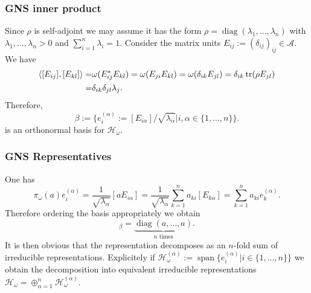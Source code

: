 \documentclass{beamer}
\DeclareMathOperator{\diag}{diag}
\DeclareMathOperator{\Span}{span}
\begin{document}
\begin{frame}
	
	\frametitle{GNS inner product}
	
	\begin{Example}
		Since $\rho$ is self-adjoint we may assume it has the form $\rho=\diag(\lambda_1,\dots,\lambda_n)$ with $\lambda_1,\dots,\lambda_n>0$ and $\sum_{i=1}^n\lambda_i=1$. Consider the matrix units $E_{ij}:=(\delta_{ij})_{ij}\in\mathcal{A}$.  We have
		\begin{align}
		\begin{split}
			\langle[E_{ij}],[E_{kl}]\rangle=&\omega(E_{ij}^*E_{kl})=\omega(E_{ji}E_{kl})=\omega(\delta_{ik}E_{jl})=\delta_{ik}\tr(\rho E_{jl})\\
		=&\delta_{ik}\delta_{jl}\lambda_j.
		\end{split}
		\end{align}
Therefore, 
		\begin{equation}
			\beta:=\{e_i^{(\alpha)}:=[E_{i\alpha}]/\sqrt{\lambda_\alpha}|i,\alpha\in\{1,\dots,n\}\}.
		\end{equation}
is an orthonormal basis for $\mathcal{H}_\omega$.
	\end{Example}
	
\end{frame}

\begin{frame}

	\frametitle{GNS Representatives}
	
	\begin{Example}
		One has
		\begin{equation}
			\pi_\omega(a)e_i^{(\alpha)}=\frac{1}{\sqrt{\lambda_\alpha}}[aE_{i\alpha}]=\frac{1}{\sqrt{\lambda_\alpha}}\sum_{k=1}^na_{ki}[E_{k\alpha}]=\sum_{k=1}^na_{ki}e_k^{(\alpha)}.
		\end{equation}
Therefore ordering the basis appropriately we obtain
		\begin{equation}
			[\pi_\omega(a)]_\beta=\underbrace{\diag(a,\dots,a)}_{\text{$n$ times}}.
		\end{equation}	
It is then obvious that the representation decomposes as an $n$-fold sum of irreducible representations. Explicitely if $\mathcal{H}_\omega^{(\alpha)}:=\Span\{e_i^{(\alpha)}|i\in\{1,\dots,n\}\}$	we obtain the decomposition into equivalent irreducible representations $\mathcal{H}_\omega=\oplus_{\alpha=1}^n\mathcal{H}_\omega^{(\alpha)}$.		 
	\end{Example}

\end{frame}
\end{document}
